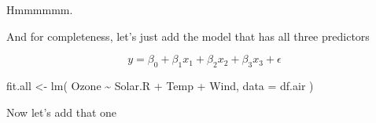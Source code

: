 \documentclass[
  letterpaper,
]{book}
\newenvironment{Shaded}{\begin{snugshade}}{\end{snugshade}}
\newcommand{\AttributeTok}[1]{\textcolor[rgb]{0.40,0.45,0.13}{#1}}
\newcommand{\FunctionTok}[1]{\textcolor[rgb]{0.28,0.35,0.67}{#1}}
\newcommand{\NormalTok}[1]{\textcolor[rgb]{0.00,0.23,0.31}{#1}}
\newcommand{\OtherTok}[1]{\textcolor[rgb]{0.00,0.23,0.31}{#1}}
\newcommand{\SpecialCharTok}[1]{\textcolor[rgb]{0.37,0.37,0.37}{#1}}
\begin{document}
Hmmmmmm.

And for completeness, let's just add the model that has all three
predictors

\[
y = \beta_0 + \beta_1 x_1 + \beta_2 x_2 + \beta_3 x_3 + \epsilon
\]

\begin{Shaded}
\begin{Highlighting}[]
\NormalTok{fit.all }\OtherTok{\textless{}{-}} \FunctionTok{lm}\NormalTok{( Ozone }\SpecialCharTok{\textasciitilde{}}\NormalTok{ Solar.R }\SpecialCharTok{+}\NormalTok{ Temp }\SpecialCharTok{+}\NormalTok{ Wind, }\AttributeTok{data =}\NormalTok{ df.air )}
\end{Highlighting}
\end{Shaded}

Now let's add that one
\end{document}
